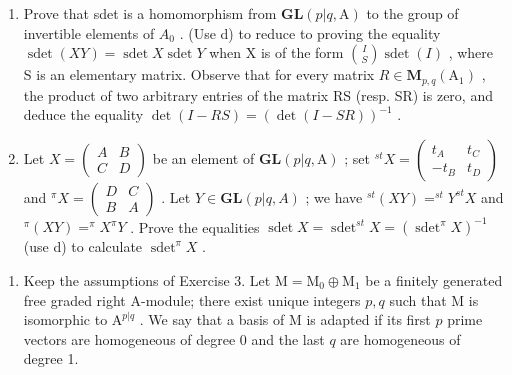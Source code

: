 \begin{enumerate}
\def\labelenumi{\alph{enumi})}
\setcounter{enumi}{4}
\tightlist
\item
  Prove that sdet is a homomorphism from \(\mathbf{GL}(p|q,\mathrm{A})\) to the group of invertible elements of \(A_{0}\) . (Use d) to reduce to proving the equality \(\operatorname{sdet}(XY)=\operatorname{sdet}X\operatorname{sdet}Y\) when X is of the form \(\binom{I}{S}\operatorname{sdet}(I)\) , where S is an elementary matrix. Observe that for every matrix \(R\in\mathbf{M}_{p,q}(\mathrm{A}_{1})\) , the product of two arbitrary entries of the matrix RS (resp. SR) is zero, and deduce the equality \(\det(I-RS)=(\det(I-SR))^{-1}\) .
\item
  Let \(X = \begin{pmatrix} A & B \\ C & D \end{pmatrix}\) be an element of \(\mathbf{GL}(p|q,\mathrm{A})\) ; set \(^{st}X = \begin{pmatrix} t_{A} & t_{C} \\ -t_{B} & t_{D} \end{pmatrix}\) and \(^{\pi}X = \begin{pmatrix} D & C \\ B & A \end{pmatrix}\) . Let \(Y \in \mathbf{GL}(p|q, A)\) ; we have \(^{st}(XY) = ^{st}Y^{st}X\) and \(^{\pi}(XY) = ^{\pi}X^{\pi}Y\) . Prove the equalities \(\operatorname{sdet}X = \operatorname{sdet}^{st}X = (\operatorname{sdet}^{\pi}X)^{-1}\) (use d) to calculate \(\operatorname{sdet}^{\pi}X\) .
\end{enumerate}

\begin{enumerate}
\def\labelenumi{\arabic{enumi})}
\setcounter{enumi}{3}
\tightlist
\item
  Keep the assumptions of Exercise 3. Let \(\mathrm{M} = \mathrm{M}_0 \oplus \mathrm{M}_1\) be a finitely generated free graded right A-module; there exist unique integers \(p, q\) such that \(\mathrm{M}\) is isomorphic to \(\mathrm{A}^{p|q}\) . We say that a basis of \(\mathrm{M}\) is adapted if its first \(p\) prime vectors are homogeneous of degree 0 and the last \(q\) are homogeneous of degree 1.
\end{enumerate}

